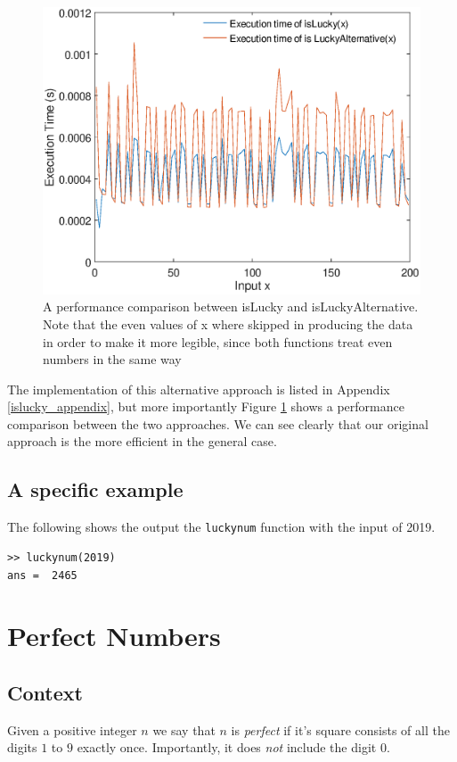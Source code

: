 \documentclass[10pt]{article}
\begin{document}
\begin{figure}

   \includegraphics[scale=0.6]{islucky_test.eps}

   \caption{A performance comparison between isLucky and isLuckyAlternative. Note that the even values of x where skipped in producing the data in order to make it more legible, since both functions treat even numbers in the same way}
      \label{isluckytest}
\end{figure}


The implementation of this alternative approach is listed in Appendix \ref{islucky_appendix}, but more importantly Figure \ref{isluckytest} shows a performance comparison between the two approaches. We can see clearly that our original approach is the more efficient in the general case.

\subsection{A specific example}

The following shows the output the \texttt{luckynum} function with the input of 2019.

\begin{verbatim}
>> luckynum(2019)
ans =  2465
\end{verbatim}

\section{Perfect Numbers}

\subsection{Context}
Given a positive integer $n$ we say that $n$ is \emph{perfect} if it's square consists of all the digits $1$ to $9$ exactly once. Importantly, it does \emph{not} include the digit $0$.
\end{document}
